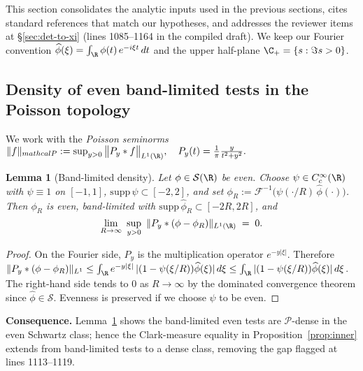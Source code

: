 ﻿\documentclass[12pt,a4paper]{article}
\newtheorem{lemma}[theorem]{Lemma}
\theoremstyle{definition}
\theoremstyle{remark}
\newcommand{\F}{\mathcal{F}}
\begin{document}
This section consolidates the analytic inputs used in the previous sections, cites standard references that match our hypotheses, and
addresses the reviewer items at \S\ref{sec:det-to-xi} (lines 1085--1164 in the compiled draft). We keep our Fourier convention
$\widehat \phi(\xi)=\int_{\R}\phi(t)\,e^{-i\xi t}\,dt$ and the upper half-plane $\C_+=\{s:\Im s>0\}$.

\subsection{Density of even band-limited tests in the Poisson topology}\label{subsec:density-bandlimited}
We work with the \emph{Poisson seminorms}
\(
  \|f\|_{\\mathcal P}:=\sup_{y>0}\big\|P_y*f\big\|_{L^1(\R)},\quad
  P_y(t)=\frac{1}{\pi}\frac{y}{t^2+y^2}.
\)
\begin{lemma}[Band-limited density]\label{lem:BL-density}
Let $\phi\in\mathcal S(\R)$ be even. Choose $\psi\in C_c^\infty(\R)$ with $\psi\equiv1$ on $[-1,1]$, $\mathrm{supp}\,\psi\subset[-2,2]$, and set
$\phi_R:=\F^{-1}\big(\psi(\cdot/R)\,\widehat\phi(\cdot)\big)$. Then $\phi_R$ is even, band-limited with $\mathrm{supp}\,\widehat\phi_R\subset[-2R,2R]$, and
\begin{equation}\label{eq:Poisson-approx}
  \lim_{R\to\infty}\ \sup_{y>0}\ \|P_y*(\phi-\phi_R)\|_{L^1(\R)}\;=\;0.
\end{equation}
\end{lemma}
\begin{proof}
On the Fourier side, $P_y$ is the multiplication operator $e^{-y|\xi|}$. Therefore
$\|P_y*(\phi-\phi_R)\|_{L^1}\le \int_\R e^{-y|\xi|}\,|(1-\psi(\xi/R))\widehat\phi(\xi)|\,d\xi \le \int_\R |(1-\psi(\xi/R))\widehat\phi(\xi)|\,d\xi$.
The right-hand side tends to $0$ as $R\to\infty$ by the dominated convergence theorem since $\widehat\phi\in\mathcal S$. Evenness is preserved if we choose $\psi$ to be even.
\end{proof}
\noindent
\textbf{Consequence.} Lemma~\ref{lem:BL-density} shows the band-limited even tests are $\mathcal P$-dense in the even Schwartz class; hence the Clark-measure equality in
Proposition~\ref{prop:inner} extends from band-limited tests to a dense class, removing the gap flagged at lines 1113--1119.
\end{document}
